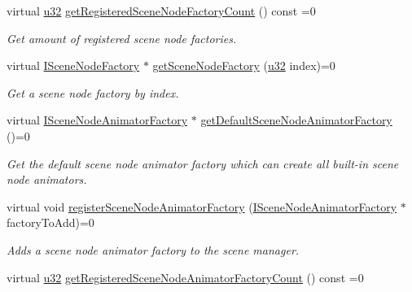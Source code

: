 \begin{DoxyCompactItemize}
\mbox{\label{classirr_1_1scene_1_1ISceneManager_a405dd898657d08cd1dbf973d1cb88b19}} 
virtual \hyperlink{namespaceirr_a0416a53257075833e7002efd0a18e804}{u32} \hyperlink{classirr_1_1scene_1_1ISceneManager_a405dd898657d08cd1dbf973d1cb88b19}{get\+Registered\+Scene\+Node\+Factory\+Count} () const =0
\begin{DoxyCompactList}\small\item\em Get amount of registered scene node factories. \end{DoxyCompactList}\item 
virtual \hyperlink{classirr_1_1scene_1_1ISceneNodeFactory}{I\+Scene\+Node\+Factory} $\ast$ \hyperlink{classirr_1_1scene_1_1ISceneManager_ac912b9effd5ce46f5dc038e0568e614c}{get\+Scene\+Node\+Factory} (\hyperlink{namespaceirr_a0416a53257075833e7002efd0a18e804}{u32} index)=0
\begin{DoxyCompactList}\small\item\em Get a scene node factory by index. \end{DoxyCompactList}\item 
virtual \hyperlink{classirr_1_1scene_1_1ISceneNodeAnimatorFactory}{I\+Scene\+Node\+Animator\+Factory} $\ast$ \hyperlink{classirr_1_1scene_1_1ISceneManager_adeb3d24c8ffafd5e671f344931a0b3a5}{get\+Default\+Scene\+Node\+Animator\+Factory} ()=0
\begin{DoxyCompactList}\small\item\em Get the default scene node animator factory which can create all built-\/in scene node animators. \end{DoxyCompactList}\item 
virtual void \hyperlink{classirr_1_1scene_1_1ISceneManager_af48c93cc41f986f08ed964cc575ee7a0}{register\+Scene\+Node\+Animator\+Factory} (\hyperlink{classirr_1_1scene_1_1ISceneNodeAnimatorFactory}{I\+Scene\+Node\+Animator\+Factory} $\ast$factory\+To\+Add)=0
\begin{DoxyCompactList}\small\item\em Adds a scene node animator factory to the scene manager. \end{DoxyCompactList}\item 
\mbox{\label{classirr_1_1scene_1_1ISceneManager_abf31f8c0dfb5242d07339fbba20a63e5}} 
virtual \hyperlink{namespaceirr_a0416a53257075833e7002efd0a18e804}{u32} \hyperlink{classirr_1_1scene_1_1ISceneManager_abf31f8c0dfb5242d07339fbba20a63e5}{get\+Registered\+Scene\+Node\+Animator\+Factory\+Count} () const =0

\end{DoxyCompactItemize}
